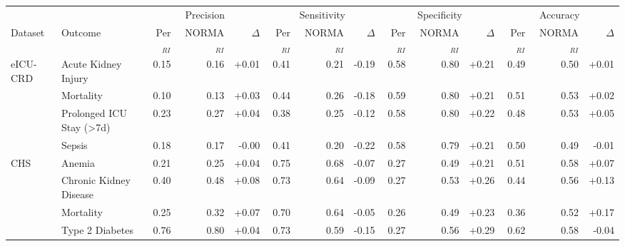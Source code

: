 \begin{table}[ht]
\centering
\footnotesize
\begin{tabular}{llrrrrrrrrrrrr}
\toprule
 &  & \multicolumn{3}{c}{Precision} & \multicolumn{3}{c}{Sensitivity} & \multicolumn{3}{c}{Specificity} & \multicolumn{3}{c}{Accuracy} \\
\cmidrule(lr){3-5} \cmidrule(lr){6-8} \cmidrule(lr){9-11} \cmidrule(lr){12-14}
Dataset & Outcome & Per$_{RI}$ & NORMA$_{RI}$ & $\Delta$ & Per$_{RI}$ & NORMA$_{RI}$ & $\Delta$ & Per$_{RI}$ & NORMA$_{RI}$ & $\Delta$ & Per$_{RI}$ & NORMA$_{RI}$ & $\Delta$ \\
\midrule
eICU-CRD & Acute Kidney Injury & 0.15 & 0.16 & +0.01 & 0.41 & 0.21 & -0.19 & 0.58 & 0.80 & +0.21 & 0.49 & 0.50 & +0.01 \\
 & Mortality & 0.10 & 0.13 & +0.03 & 0.44 & 0.26 & -0.18 & 0.59 & 0.80 & +0.21 & 0.51 & 0.53 & +0.02 \\
 & Prolonged ICU Stay (>7d) & 0.23 & 0.27 & +0.04 & 0.38 & 0.25 & -0.12 & 0.58 & 0.80 & +0.22 & 0.48 & 0.53 & +0.05 \\
 & Sepsis & 0.18 & 0.17 & -0.00 & 0.41 & 0.20 & -0.22 & 0.58 & 0.79 & +0.21 & 0.50 & 0.49 & -0.01 \\
CHS & Anemia & 0.21 & 0.25 & +0.04 & 0.75 & 0.68 & -0.07 & 0.27 & 0.49 & +0.21 & 0.51 & 0.58 & +0.07 \\
 & Chronic Kidney Disease & 0.40 & 0.48 & +0.08 & 0.73 & 0.64 & -0.09 & 0.27 & 0.53 & +0.26 & 0.44 & 0.56 & +0.13 \\
 & Mortality & 0.25 & 0.32 & +0.07 & 0.70 & 0.64 & -0.05 & 0.26 & 0.49 & +0.23 & 0.36 & 0.52 & +0.17 \\
 & Type 2 Diabetes & 0.76 & 0.80 & +0.04 & 0.73 & 0.59 & -0.15 & 0.27 & 0.56 & +0.29 & 0.62 & 0.58 & -0.04 \\
\bottomrule
\end{tabular}
\label{tab:eval}
\end{table}